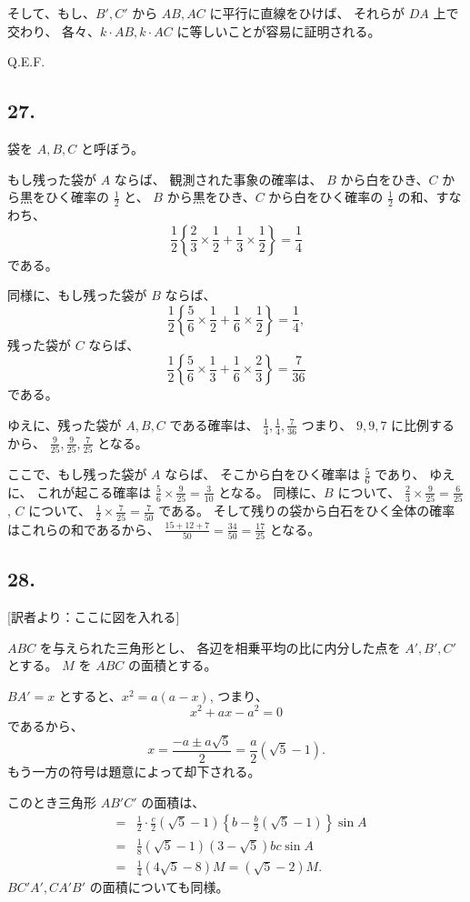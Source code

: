 そして、もし、$B', C'$ から $AB, AC$ に平行に直線をひけば、
それらが $DA$ 上で交わり、
各々、$k \cdot AB, k \cdot AC$ に等しいことが容易に証明される。

Q.E.F.

\subsection*{27.}

袋を $A, B, C$ と呼ぼう。

もし残った袋が $A$ ならば、
観測された事象の確率は、
$B$ から白をひき、$C$ から黒をひく確率の $\frac{1}{2}$
と、
$B$ から黒をひき、$C$ から白をひく確率の $\frac{1}{2}$
の和、すなわち、
\[
\frac{1}{2} \left\{ \frac{2}{3} \times \frac{1}{2}
 + \frac{1}{3} \times \frac{1}{2} \right\} = \frac{1}{4}
\]
である。

同様に、もし残った袋が $B$ ならば、
\[
\frac{1}{2} \left\{ \frac{5}{6} \times \frac{1}{2}
 + \frac{1}{6} \times \frac{1}{2} \right\} = \frac{1}{4},
 \]
残った袋が $C$ ならば、
\[
\frac{1}{2} \left\{ \frac{5}{6} \times \frac{1}{3}
 + \frac{1}{6} \times \frac{2}{3} \right\} = \frac{7}{36}
 \]
である。

ゆえに、残った袋が $A, B, C$ である確率は、
$\frac{1}{4}, \frac{1}{4}, \frac{7}{36}$ つまり、
$9, 9, 7$ に比例するから、
$\frac{9}{25}, \frac{9}{25}, \frac{7}{25}$ となる。

ここで、もし残った袋が $A$ ならば、
そこから白をひく確率は $\frac{5}{6}$ であり、
ゆえに、
これが起こる確率は $\frac{5}{6} \times \frac{9}{25} = \frac{3}{10}$
となる。
同様に、$B$ について、
$\frac{2}{3} \times \frac{9}{25} = \frac{6}{25}$,
$C$ について、
$\frac{1}{2} \times \frac{7}{25} = \frac{7}{50}$
である。
そして残りの袋から白石をひく全体の確率はこれらの和であるから、
$\frac{15+12+7}{50} = \frac{34}{50} = \frac{17}{25}$
となる。

\subsection*{28.}

[訳者より：ここに図を入れる]

$ABC$ を与えられた三角形とし、
各辺を相乗平均の比に内分した点を $A', B', C'$ とする。
$M$ を $ABC$ の面積とする。

$BA' = x$ とすると、$x^2 = a (a-x)$, つまり、
\[
x^2 + ax - a^2 = 0
\]
であるから、
\[
x = \frac{-a \pm a \sqrt{5}}{2}
 = \frac{a}{2} (\sqrt{5} - 1).
 \]
もう一方の符号は題意によって却下される。

このとき三角形 $AB'C'$ の面積は、
\begin{eqnarray*}
&=&
\frac{1}{2} \cdot \frac{c}{2}
 (\sqrt{5} - 1) \left\{ b - \frac{b}{2} ( \sqrt{5} - 1) \right\} \sin A\\
&=&
\frac{1}{8}
 (\sqrt{5} - 1) (3 - \sqrt{5}) bc \sin A\\
&=&
\frac{1}{4} (4 \sqrt{5} - 8) M = (\sqrt{5} - 2) M.
\end{eqnarray*}
$BC'A', CA'B'$ の面積についても同様。

